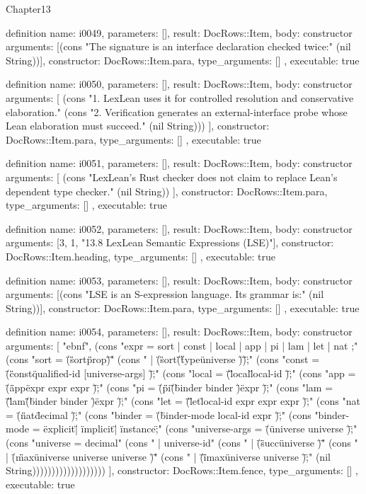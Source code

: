 \begin{lexlean}{Chapter13}
\begin{semanticmodule}
definition{
  name: i0049,
  parameters: [],
  result: DocRows::Item,
  body: constructor{
    arguments: [(cons "The signature is an interface declaration checked twice:" (nil String))],
    constructor: DocRows::Item.para,
    type_arguments: []
  },
  executable: true
}

definition{
  name: i0050,
  parameters: [],
  result: DocRows::Item,
  body: constructor{
    arguments: [
      (cons "1. LexLean uses it for controlled resolution and conservative elaboration." (cons "2. Verification generates an external-interface probe whose Lean elaboration must succeed." (nil String)))
    ],
    constructor: DocRows::Item.para,
    type_arguments: []
  },
  executable: true
}

definition{
  name: i0051,
  parameters: [],
  result: DocRows::Item,
  body: constructor{
    arguments: [
      (cons "LexLean's Rust checker does not claim to replace Lean's dependent type checker." (nil String))
    ],
    constructor: DocRows::Item.para,
    type_arguments: []
  },
  executable: true
}

definition{
  name: i0052,
  parameters: [],
  result: DocRows::Item,
  body: constructor{
    arguments: [3, 1, "13.8 LexLean Semantic Expressions (LSE)"],
    constructor: DocRows::Item.heading,
    type_arguments: []
  },
  executable: true
}

definition{
  name: i0053,
  parameters: [],
  result: DocRows::Item,
  body: constructor{
    arguments: [(cons "LSE is an S-expression language. Its grammar is:" (nil String))],
    constructor: DocRows::Item.para,
    type_arguments: []
  },
  executable: true
}

definition{
  name: i0054,
  parameters: [],
  result: DocRows::Item,
  body: constructor{
    arguments: [
      "ebnf",
      (cons "expr        = sort | const | local | app | pi | lam | let | nat ;" (cons "sort        = \"(\" \"sort\" \"prop\" \")\"" (cons "            | \"(\" \"sort\" \"(\" \"type\" universe \")\" \")\" ;" (cons "const       = \"(\" \"const\" qualified-id [universe-args] \")\" ;" (cons "local       = \"(\" \"local\" local-id \")\" ;" (cons "app         = \"(\" \"app\" expr expr {expr} \")\" ;" (cons "pi          = \"(\" \"pi\" \"(\" binder {binder} \")\" expr \")\" ;" (cons "lam         = \"(\" \"lam\" \"(\" binder {binder} \")\" expr \")\" ;" (cons "let         = \"(\" \"let\" local-id expr expr expr \")\" ;" (cons "nat         = \"(\" \"nat\" decimal \")\" ;" (cons "binder      = \"(\" binder-mode local-id expr \")\" ;" (cons "binder-mode = \"explicit\" | \"implicit\" | \"instance\" ;" (cons "universe-args = \"(\" universe {universe} \")\" ;" (cons "universe    = decimal" (cons "            | universe-id" (cons "            | \"(\" \"succ\" universe \")\"" (cons "            | \"(\" \"max\" universe universe {universe} \")\"" (cons "            | \"(\" \"imax\" universe universe \")\" ;" (nil String)))))))))))))))))))
    ],
    constructor: DocRows::Item.fence,
    type_arguments: []
  },
  executable: true
}


\end{semanticmodule}
\end{lexlean}

